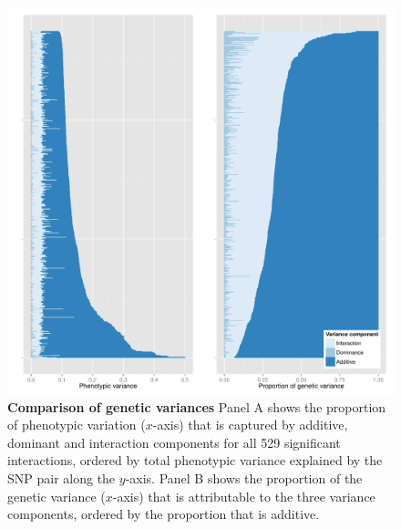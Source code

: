 \documentclass{article}
\begin{document}
\begin{figure}[H]
	\includegraphics[width=5in]{variance_components.pdf}
	\caption{\textbf{Comparison of genetic variances} Panel A shows the proportion of phenotypic variation ($x$-axis) that is captured by additive, dominant and interaction components for all 529 significant interactions, ordered by total phenotypic variance explained by the SNP pair along the $y$-axis. Panel B shows the proportion of the genetic variance ($x$-axis) that is attributable to the three variance components, ordered by the proportion that is additive.}
	\label{fig:variancecomponents}
\end{figure}
\clearpage




\end{document}
